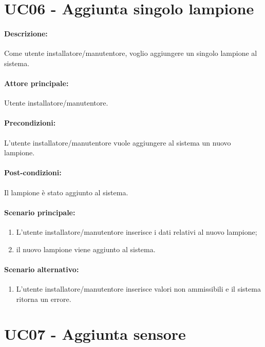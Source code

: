 \section{UC06 - Aggiunta singolo lampione}

\paragraph{Descrizione:}
Come utente installatore/manutentore, voglio aggiungere un singolo lampione al sistema.

\paragraph{Attore principale:}
Utente installatore/manutentore.

\paragraph{Precondizioni:}
L'utente installatore/manutentore vuole aggiungere al sistema un nuovo lampione.

\paragraph{Post-condizioni:}
Il lampione è stato aggiunto al sistema.

\paragraph{Scenario principale:}
\begin{enumerate}
    \item L'utente installatore/manutentore inserisce i dati relativi al nuovo lampione;
    \item il nuovo lampione viene aggiunto al sistema.
\end{enumerate}

\paragraph{Scenario alternativo:}
\begin{enumerate}
    \item L'utente installatore/manutentore inserisce valori non ammissibili e il sistema ritorna un errore.
\end{enumerate}

\section{UC07 - Aggiunta sensore}

